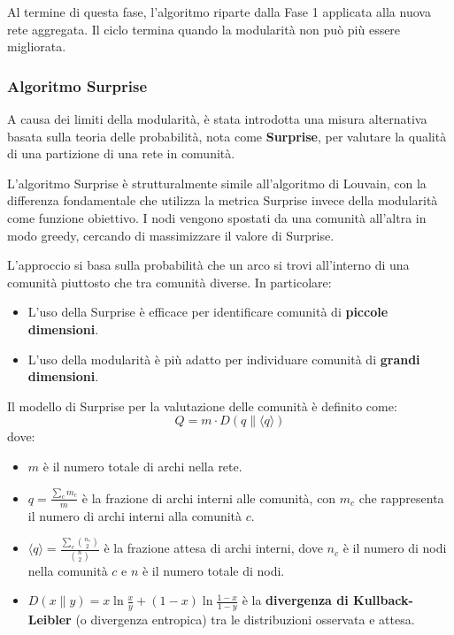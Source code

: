 Al termine di questa fase, l'algoritmo riparte dalla Fase 1 applicata alla
nuova rete aggregata. Il ciclo termina quando la modularità non può più essere
migliorata.

\subsubsection{Algoritmo Surprise}

A causa dei limiti della modularità, è stata introdotta una misura alternativa
basata sulla teoria delle probabilità, nota come \textbf{Surprise}, per
valutare la qualità di una partizione di una rete in comunità.

L'algoritmo Surprise è strutturalmente simile all'algoritmo di Louvain, con la
differenza fondamentale che utilizza la metrica Surprise invece della
modularità come funzione obiettivo. I nodi vengono spostati da una comunità
all'altra in modo greedy, cercando di massimizzare il valore di Surprise.

L'approccio si basa sulla probabilità che un arco si trovi all'interno di una
comunità piuttosto che tra comunità diverse. In particolare:
\begin{itemize}
    \item L'uso della Surprise è efficace per identificare comunità di
    \textbf{piccole dimensioni}.
    \item L'uso della modularità è più adatto per individuare comunità di
    \textbf{grandi dimensioni}.
\end{itemize}

Il modello di Surprise per la valutazione delle comunità è definito come:
\[
Q = m \cdot D(q \| \langle q \rangle)
\]
dove:
\begin{itemize}
    \item $m$ è il numero totale di archi nella rete.
    \item $q = \frac{\sum_c m_c}{m}$ è la frazione di archi interni alle
    comunità, con $m_c$ che rappresenta il numero di archi interni alla
    comunità $c$.
    \item $\langle q \rangle = \frac{\sum_c \binom{n_c}{2}}{\binom{n}{2}}$ è la
    frazione attesa di archi interni, dove $n_c$ è il numero di nodi nella
    comunità $c$ e $n$ è il numero totale di nodi.
    \item $D(x \| y) = x \ln\frac{x}{y} + (1-x) \ln\frac{1-x}{1-y}$ è la
    \textbf{divergenza di Kullback-Leibler} (o divergenza entropica) tra le
    distribuzioni osservata e attesa.
\end{itemize}


